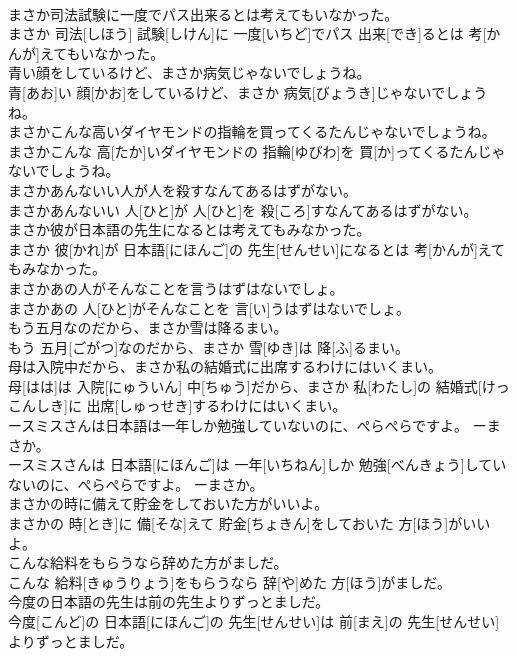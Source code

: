 \documentclass[8pt]{extreport}
\begin{document}
\begin{CJK}{UTF8}{min}
\\	まさか司法試験に一度でパス出来るとは考えてもいなかった。	
\\	まさか 司法[しほう] 試験[しけん]に 一度[いちど]でパス 出来[でき]るとは 考[かんが]えてもいなかった。
\\	青い顔をしているけど、まさか病気じゃないでしょうね。	
\\	青[あお]い 顔[かお]をしているけど、まさか 病気[びょうき]じゃないでしょうね。
\\	まさかこんな高いダイヤモンドの指輪を買ってくるたんじゃないでしょうね。	
\\	まさかこんな 高[たか]いダイヤモンドの 指輪[ゆびわ]を 買[か]ってくるたんじゃないでしょうね。
\\	まさかあんないい人が人を殺すなんてあるはずがない。	
\\	まさかあんないい 人[ひと]が 人[ひと]を 殺[ころ]すなんてあるはずがない。
\\	まさか彼が日本語の先生になるとは考えてもみなかった。	
\\	まさか 彼[かれ]が 日本語[にほんご]の 先生[せんせい]になるとは 考[かんが]えてもみなかった。
\\	まさかあの人がそんなことを言うはずはないでしょ。	
\\	まさかあの 人[ひと]がそんなことを 言[い]うはずはないでしょ。
\\	もう五月なのだから、まさか雪は降るまい。	
\\	もう 五月[ごがつ]なのだから、まさか 雪[ゆき]は 降[ふ]るまい。
\\	母は入院中だから、まさか私の結婚式に出席するわけにはいくまい。	
\\	母[はは]は 入院[にゅういん] 中[ちゅう]だから、まさか 私[わたし]の 結婚式[けっこんしき]に 出席[しゅっせき]するわけにはいくまい。
\\	ースミスさんは日本語は一年しか勉強していないのに、ぺらぺらですよ。 ーまさか。	
\\	ースミスさんは 日本語[にほんご]は 一年[いちねん]しか 勉強[べんきょう]していないのに、ぺらぺらですよ。 ーまさか。
\\	まさかの時に備えて貯金をしておいた方がいいよ。	
\\	まさかの 時[とき]に 備[そな]えて 貯金[ちょきん]をしておいた 方[ほう]がいいよ。
\\	こんな給料をもらうなら辞めた方がましだ。	
\\	こんな 給料[きゅうりょう]をもらうなら 辞[や]めた 方[ほう]がましだ。
\\	今度の日本語の先生は前の先生よりずっとましだ。	
\\	今度[こんど]の 日本語[にほんご]の 先生[せんせい]は 前[まえ]の 先生[せんせい]よりずっとましだ。

\end{CJK}
\end{document}
